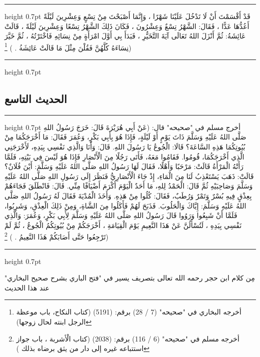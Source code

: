 \documentclass[12pt,openany]{book}
\newenvironment{hadithblock}
  {\par\medskip\noindent\begin{minipage}{\linewidth}\hrule height 0.7pt \vspace{0.6em}\small}
  {\vspace{0.4em}\hrule height 0.7pt\end{minipage}\par\medskip}
\newenvironment{sourceintro}
  {\par\medskip\noindent\titlefont\color{gold}}
  {\par\smallskip}
\begin{document}
\begin{hadithblock}
قَدْ أَقْسَمْتَ أَنْ لَا تَدْخُلَ عَلَيْنَا شَهْرًا ، وَإِنَّمَا أَصْبَحْتَ مِنْ تِسْعٍ وَعِشْرِينَ لَيْلَةً أَعُدُّهَا عَدًّا ، فَقَالَ: الشَّهْرُ تِسْعٌ وَعِشْرُونَ ، فَكَانَ ذَلِكَ الشَّهْرُ تِسْعًا وَعِشْرِينَ لَيْلَةً ، قَالَتْ عَائِشَةُ: ثُمَّ أَنْزَلَ اللهُ تَعَالَى آيَةَ التَّخَيُّرِ ، فَبَدَأَ بِي أَوَّلَ امْرَأَةٍ مِنْ نِسَائِهِ فَاخْتَرْتُهُ ، ثُمَّ خَيَّرَ نِسَاءَهُ كُلَّهُنَّ فَقُلْنَ مِثْلَ مَا قَالَتْ عَائِشَةُ . ) \footnote{أخرجه البخاري في "صحيحه" (7 / 28) برقم: (5191) (كتاب النكاح، باب موعظة الرجل ابنته لحال زوجها)})
\end{hadithblock}

\subsection*{الحديث التاسع}
\begin{hadithblock}
أخرج مسلم في "صحيحه" قال: (عَنْ أَبِي هُرَيْرَةَ قَالَ: خَرَجَ رَسُولُ اللهِ صَلَّى اللهُ عَلَيْهِ وَسَلَّمَ ذَاتَ يَوْمٍ أَوْ لَيْلَةٍ، فَإِذَا هُوَ بِأَبِي بَكْرٍ، وَعُمَرَ فَقَالَ: مَا أَخْرَجَكُمَا مِنْ بُيُوتِكُمَا هَذِهِ السَّاعَةَ؟ قَالَا: الْجُوعُ يَا رَسُولَ اللهِ. قَالَ: وَأَنَا وَالَّذِي نَفْسِي بِيَدِهِ، لَأَخْرَجَنِي الَّذِي أَخْرَجَكُمَا، قُومُوا. فَقَامُوا مَعَهُ، فَأَتَى رَجُلًا مِنَ الْأَنْصَارِ فَإِذَا هُوَ لَيْسَ فِي بَيْتِهِ، فَلَمَّا رَأَتْهُ الْمَرْأَةُ قَالَتْ: مَرْحَبًا وَأَهْلًا، فَقَالَ لَهَا رَسُولُ اللهِ صَلَّى اللهُ عَلَيْهِ وَسَلَّمَ: أَيْنَ فُلَانٌ؟ قَالَتْ: ذَهَبَ يَسْتَعْذِبُ لَنَا مِنَ الْمَاءِ، إِذْ جَاءَ الْأَنْصَارِيُّ فَنَظَرَ إِلَى رَسُولِ اللهِ صَلَّى اللهُ عَلَيْهِ وَسَلَّمَ وَصَاحِبَيْهِ ثُمَّ قَالَ: الْحَمْدُ لِلهِ، مَا أَحَدٌ الْيَوْمَ أَكْرَمَ أَضْيَافًا مِنِّي. قَالَ: فَانْطَلَقَ فَجَاءَهُمْ بِعِذْقٍ فِيهِ بُسْرٌ وَتَمْرٌ وَرُطَبٌ، فَقَالَ: كُلُوا مِنْ هَذِهِ. وَأَخَذَ الْمُدْيَةَ فَقَالَ لَهُ رَسُولُ اللهِ صَلَّى اللهُ عَلَيْهِ وَسَلَّمَ: إِيَّاكَ وَالْحَلُوبَ. فَذَبَحَ لَهُمْ فَأَكَلُوا مِنَ الشَّاةِ، وَمِنْ ذَلِكَ الْعِذْقِ، وَشَرِبُوا، فَلَمَّا أَنْ شَبِعُوا وَرَوُوا قَالَ رَسُولُ اللهِ صَلَّى اللهُ عَلَيْهِ وَسَلَّمَ لِأَبِي بَكْرٍ، وَعُمَرَ: وَالَّذِي نَفْسِي بِيَدِهِ ، لَتُسْأَلُنَّ عَنْ هَذَا النَّعِيمِ يَوْمَ الْقِيَامَةِ ، أَخْرَجَكُمْ مِنْ بُيُوتِكُمُ الْجُوعُ ، ثُمَّ لَمْ تَرْجِعُوا حَتَّى أَصَابَكُمْ هَذَا النَّعِيمُ . ) \footnote{أخرجه مسلم في "صحيحه" (6 / 116) برقم: (2038) (كتاب الْأشربة ، باب جواز استتباعه غيره إلى دار من يثق برضاه بذلك )})
\end{hadithblock}

\begin{sourceintro}مِن كلام ابن حجر رحمه الله تعالى بتصريف يسير في "فتح الباري بشرح صحيح البخاري" عند هذا الحديث\end{sourceintro}
\end{document}
